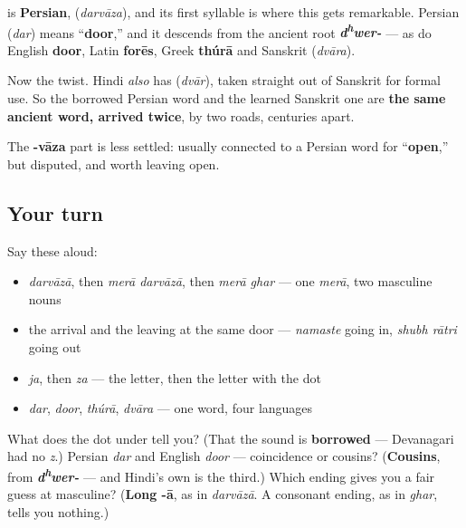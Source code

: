 \begin{cousinweb}
\textbf{} is \textbf{Persian}, \textbf{} (\emph{darvāza}), and its first syllable is where this gets remarkable. Persian \textbf{} (\emph{dar}) means \textquotedblleft{}\textbf{door},\textquotedblright{} and it descends from the ancient root \emph{\textbf{d\textsuperscript{h}wer-}} — as do English \textbf{door}, Latin \textbf{forēs}, Greek \textbf{thúrā} and Sanskrit \textbf{} (\emph{dvāra}).

Now the twist. Hindi \emph{also} has \textbf{} (\emph{dvār}), taken straight out of Sanskrit for formal use. So the borrowed Persian word and the learned Sanskrit one are \textbf{the same ancient word, arrived twice}, by two roads, centuries apart.

The \textbf{-vāza} part is less settled: usually connected to a Persian word for \textquotedblleft{}\textbf{open},\textquotedblright{} but disputed, and worth leaving open.
\end{cousinweb}

\subsection*{Your turn}
Say these aloud:

\begin{itemize}
\raggedright
  \item \emph{darvāzā}, then \emph{merā darvāzā}, then \emph{merā ghar} — one \emph{merā}, two masculine nouns
  \item the arrival and the leaving at the same door — \emph{namaste} going in, \emph{shubh rātri} going out
  \item \emph{ja}, then \emph{za} — the letter, then the letter with the dot
  \item \emph{dar}, \emph{door}, \emph{thúrā}, \emph{dvāra} — one word, four languages
\end{itemize}

\begin{tcolorbox}[breakable,colback=teal!4,colframe=teal!35!black,title={Before you move on}]
What does the dot under \textbf{} tell you? (That the sound is \textbf{borrowed} — Devanagari had no \emph{z}.) Persian \emph{dar} and English \emph{door} — coincidence or cousins? (\textbf{Cousins}, from \emph{\textbf{d\textsuperscript{h}wer-}} — and Hindi's own \textbf{} is the third.) Which ending gives you a fair guess at masculine? (\textbf{Long -ā}, as in \emph{darvāzā}. A consonant ending, as in \emph{ghar}, tells you nothing.)
\end{tcolorbox}
